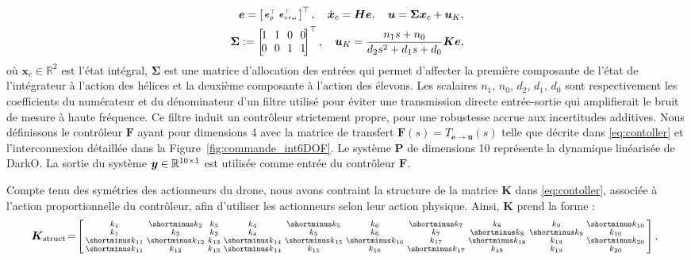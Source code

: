 \begin{subequations}
    \label{eq:contoller}
    \begin{align}
        \boldsymbol{e} = \smallmat{
        \boldsymbol{e}_{p}^\top & \boldsymbol{e}_{v\epsilon\omega}^\top}^\top, \quad \dot{\boldsymbol{x}}_{c} = \boldsymbol{H} \boldsymbol{e}, \quad    \boldsymbol{u} = \boldsymbol{\Sigma} \boldsymbol{x}_{c} + \boldsymbol{u}_{K},
        \\
        \boldsymbol{\Sigma} := \begin{bmatrix} \! 1 \!&\! 1\! & \!0\! &\! 0\!\\ \!0\! & \!0\! & \!1 \!& \!1\!\end{bmatrix}^\top, \quad
        \boldsymbol{u}_{K} = \frac{n_1 s+n_0}{d_2 s^{2}+d_1 s + d_0}\boldsymbol{K} \boldsymbol{e} ,
    \end{align}
\end{subequations}
où $\boldsymbol{x}_{c} \in \mathbb{R}^{2}$ est l'état intégral, $\boldsymbol{\Sigma}$ est une matrice d'allocation des entrées qui permet d'affecter la première composante de l'état de l'intégrateur à l'action des hélices et la deuxième composante à l'action des élevons. Les scalaires $n_1$, $n_0$,  $d_2$,  $d_1$,  $d_0$ sont respectivement les coefficients du numérateur et du dénominateur d'un filtre utilisé pour éviter une transmission directe entrée-sortie qui amplifierait le bruit de mesure à haute fréquence. Ce filtre induit un contrôleur strictement propre, pour une robustesse accrue aux incertitudes additives. Nous définissons le contrôleur $\boldsymbol{F}$ ayant pour dimensions 4 avec la matrice de transfert $\boldsymbol{F}(s) = T_{\boldsymbol{e} \rightarrow \boldsymbol{u}}(s)$ telle que décrite dans \eqref{eq:contoller} et l'interconnexion détaillée dans la Figure~\ref{fig:commande_int6DOF}. Le système $\boldsymbol{P}$ de dimensions 10 représente la dynamique linéarisée de DarkO. La sortie du système $\boldsymbol{y} \in {\mathbb R}^{10\times1}$ est utilisée comme entrée du contrôleur $\boldsymbol{F}$.

Compte tenu des symétries des actionneurs du drone, nous avons contraint la structure de la matrice $\boldsymbol{K}$ dans \eqref{eq:contoller}, associée à l'action proportionnelle du contrôleur, afin d'utiliser les actionneurs selon leur action physique. Ainsi, $\boldsymbol{K}$ prend la forme : 
\begin{align}
\label{eq:k_struct}
    \!\!\!\boldsymbol{K}_{\text{struct}} \!=\!  \smallmat{
             k_{1}& \shortminus k_{2}& k_{3}&  k_{4}& \shortminus k_{5}&  k_{6}& \shortminus k_{7}&  k_{8}&  k_{9}& \shortminus k_{10}\\
             k_{1}&  k_{2}& k_{3}&  k_{4}&  k_{5}&  k_{6}&   k_{7}& \shortminus k_{8}& \shortminus k_{9}&  k_{10}\\
            \shortminus k_{11}& \shortminus k_{12}& k_{13}& \shortminus k_{14}& \shortminus k_{15}& \shortminus k_{16}&   k_{17}& \shortminus k_{18}&  k_{19}& \shortminus k_{20}\\
            \shortminus k_{11}&  k_{12}& k_{13}& \shortminus k_{14}&  k_{15}&  k_{16}&   \shortminus k_{17}&  k_{18}&  k_{19}&  k_{20} 
         }.
\end{align}

